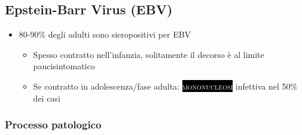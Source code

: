 \documentclass[italian,]{article}
\providecommand{\tightlist}{%
  \setlength{\itemsep}{0pt}\setlength{\parskip}{0pt}}
\newcommand{\pat}[1]{\colorbox{black}{\textcolor{white}{\textsc{#1}}}}
\begin{document}
\hypertarget{epstein-barr-virus-ebv}{%
\subsection{Epstein-Barr Virus (EBV)}\label{epstein-barr-virus-ebv}}

\begin{itemize}
\tightlist
\item
  80-90\% degli adulti sono sieropositivi per EBV

  \begin{itemize}
  \tightlist
  \item
    Spesso contratto nell'infanzia, solitamente il decorso è al limite
    paucisintomatico
  \item
    Se contratto in adolescenza/fase adulta: \pat{mononucleosi}
    infettiva nel 50\% dei casi
  \end{itemize}
\end{itemize}

\hypertarget{processo-patologico}{%
\subsubsection{Processo patologico}\label{processo-patologico}}
\end{document}

